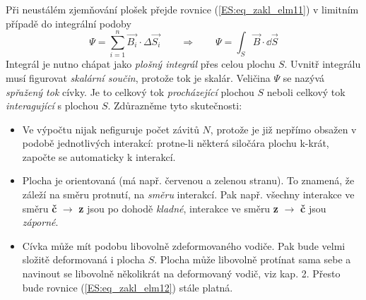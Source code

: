         Při neustálém zjemňování plošek přejde rovnice (\ref{ES:eq_zakl_elm11}) v limitním případě 
        do integrální podoby
        \begin{equation}\label{ES:eq_zakl_elm12}
          \Psi = \sum_{i=1}^n\vec{B_i}\cdot\Delta\vec{S_i} \qquad\Longrightarrow\qquad
          \Psi = \int_S\vec{B}\cdot \dd{\vec{S}}
        \end{equation}
        Integrál je nutno chápat jako \emph{plošný integrál} přes celou plochu \(S\). Uvnitř 
        integrálu musí figurovat \emph{skalární součin}, protože tok je skalár. Veličina \(\Psi\) 
        se nazývá \emph{spřažený tok} cívky. Je to celkový tok \emph{procházející} plochou \(S\) 
        neboli celkový tok \emph{interagující} s plochou \(S\). Zdůrazněme tyto skutečnosti:
        \begin{itemize}[noitemsep]
          \item Ve výpočtu nijak nefiguruje počet závitů \(N\), protože je již nepřímo obsažen v 
                podobě jednotlivých interakcí: protne-li některá siločára plochu k-krát, započte se 
                automaticky k interakcí.
        
          \item Plocha je orientovaná (má např. červenou a zelenou stranu). To znamená, že záleží 
                na směru protnutí, na \emph{směru} interakcí. Pak např. všechny interakce ve směru 
                \textbf{č} \(\rightarrow\) \textbf{z} jsou po dohodě \emph{kladné}, interakce 
                ve směru \textbf{z} \(\rightarrow\) \textbf{č} jsou \emph{záporné}.
        
          \item Cívka může mít podobu libovolně zdeformovaného vodiče. Pak bude velmi složitě 
                deformovaná i plocha \(S\). Plocha může libovolně protínat sama sebe a navinout se 
                libovolně několikrát na deformovaný vodič, viz kap. 2. Přesto bude rovnice 
                (\ref{ES:eq_zakl_elm12}) stále platná.
      \end{itemize}
      
